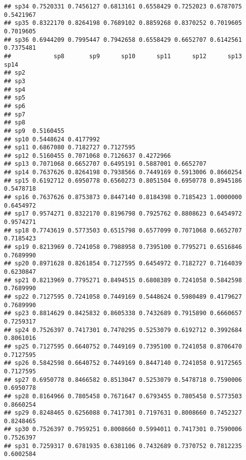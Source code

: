 \documentclass[
]{book}
\begin{document}
\begin{verbatim}
## sp34 0.7520331 0.7456127 0.6813161 0.6558429 0.7252023 0.6787075 0.5421967
## sp35 0.8322170 0.8264198 0.7689102 0.8859268 0.8370252 0.7019605 0.7019605
## sp36 0.6944209 0.7995447 0.7942658 0.6558429 0.6652707 0.6142561 0.7375481
##            sp8       sp9      sp10      sp11      sp12      sp13      sp14
## sp2                                                                       
## sp3                                                                       
## sp4                                                                       
## sp5                                                                       
## sp6                                                                       
## sp7                                                                       
## sp8                                                                       
## sp9  0.5160455                                                            
## sp10 0.5448624 0.4177992                                                  
## sp11 0.6867080 0.7182727 0.7127595                                        
## sp12 0.5160455 0.7071068 0.7126637 0.4272966                              
## sp13 0.7071068 0.6652707 0.6495191 0.5887001 0.6652707                    
## sp14 0.7637626 0.8264198 0.7938566 0.7449169 0.5913006 0.8660254          
## sp15 0.6192712 0.6950778 0.6560273 0.8051504 0.6950778 0.8945186 0.5478718
## sp16 0.7637626 0.8753873 0.8447140 0.8184398 0.7185423 1.0000000 0.6454972
## sp17 0.9574271 0.8322170 0.8196798 0.7925762 0.8808623 0.6454972 0.9574271
## sp18 0.7743619 0.5773503 0.6515798 0.6577099 0.7071068 0.6652707 0.7185423
## sp19 0.8213969 0.7241058 0.7988958 0.7395100 0.7795271 0.6516846 0.7689990
## sp20 0.8971628 0.8261854 0.7127595 0.6454972 0.7182727 0.7164039 0.6230847
## sp21 0.8213969 0.7795271 0.8494515 0.6808389 0.7241058 0.5842598 0.7689990
## sp22 0.7127595 0.7241058 0.7449169 0.5448624 0.5980489 0.4179627 0.7689990
## sp23 0.8814629 0.8425832 0.8605338 0.7432689 0.7915890 0.6660657 0.7259317
## sp24 0.7526397 0.7417301 0.7470295 0.5253079 0.6192712 0.3992684 0.8061016
## sp25 0.7127595 0.6640752 0.7449169 0.7395100 0.7241058 0.8706470 0.7127595
## sp26 0.5842598 0.6640752 0.7449169 0.8447140 0.7241058 0.9172565 0.7127595
## sp27 0.6950778 0.8466582 0.8513047 0.5253079 0.5478718 0.7590006 0.6950778
## sp28 0.8164966 0.7805458 0.7671647 0.6793455 0.7805458 0.5773503 0.8660254
## sp29 0.8248465 0.6256088 0.7417301 0.7197631 0.8008660 0.7452327 0.8248465
## sp30 0.7526397 0.7959251 0.8008660 0.5994011 0.7417301 0.7590006 0.7526397
## sp31 0.7259317 0.6781935 0.6381106 0.7432689 0.7370752 0.7812235 0.6002584

\end{verbatim}
\end{document}
